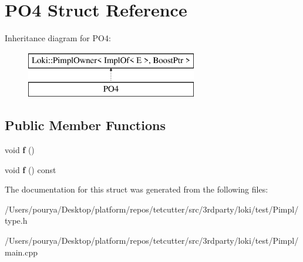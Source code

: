 \hypertarget{structPO4}{}\section{P\+O4 Struct Reference}
\label{structPO4}
Inheritance diagram for P\+O4\+:\begin{figure}[H]
\begin{center}
\leavevmode
\includegraphics[height=2.000000cm]{structPO4}
\end{center}
\end{figure}
\subsection*{Public Member Functions}
\begin{DoxyCompactItemize}
\item 
\hypertarget{structPO4_a977bd8c3539f92ebed1c5aa72d5bd9f5}{}void {\bfseries f} ()\label{structPO4_a977bd8c3539f92ebed1c5aa72d5bd9f5}

\item 
\hypertarget{structPO4_a042d00432e3f739ba05c95004abafdb0}{}void {\bfseries f} () const \label{structPO4_a042d00432e3f739ba05c95004abafdb0}

\end{DoxyCompactItemize}


The documentation for this struct was generated from the following files\+:\begin{DoxyCompactItemize}
\item 
/\+Users/pourya/\+Desktop/platform/repos/tetcutter/src/3rdparty/loki/test/\+Pimpl/type.\+h\item 
/\+Users/pourya/\+Desktop/platform/repos/tetcutter/src/3rdparty/loki/test/\+Pimpl/main.\+cpp\end{DoxyCompactItemize}
